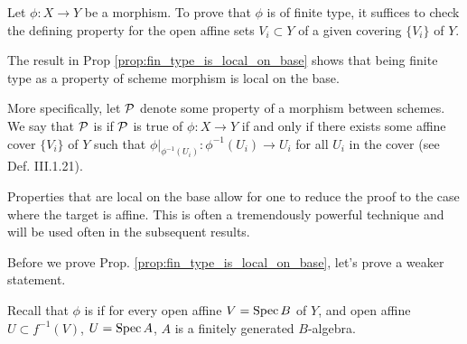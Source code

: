 \begin{prop}
\label{prop:fin_type_is_local_on_base}
Let $\phi: X \to Y$ be a morphism. To prove that $\phi$ is of 
finite type, it suffices to check the defining property for the 
open affine sets $V_i \subset Y$ of a given covering $\{V_i\}$ of 
$Y$.
\end{prop}

\begin{rmk}
The result in Prop \ref{prop:fin_type_is_local_on_base} shows
that being finite type as a property of scheme morphism is local
on the base. 

More specifically, let $\mathcal{P}$ denote some property of a 
morphism between schemes. We say that $\mathcal{P}$ is 
 if $\mathcal{P}$ is 
true of $\phi : X \to Y$ if and only if there exists some affine 
cover $\{V_i\}$ of $Y$ such that $\phi|_{\phi^{-1}(U_i)}: 
\phi^{-1}(U_i) \to U_i$ for all $U_i$ in the cover (see \cite{Liu}
Def. III.1.21). 

Properties that are local on the base allow for one to reduce
the proof to the case where the target is affine. This is often
a tremendously powerful technique and will be used often in the
subsequent results.
\end{rmk}

Before we prove Prop. \ref{prop:fin_type_is_local_on_base}, let's
prove a weaker statement.

\begin{defn}
Recall that $\phi$ is  if for every open affine $V = \mathrm{Spec}\, B$ of $Y$, 
and open affine $U \subset f^{-1}(V)$, $U = \mathrm{Spec}\, A$, $A$ is a
finitely generated $B$-algebra.
\end{defn}

